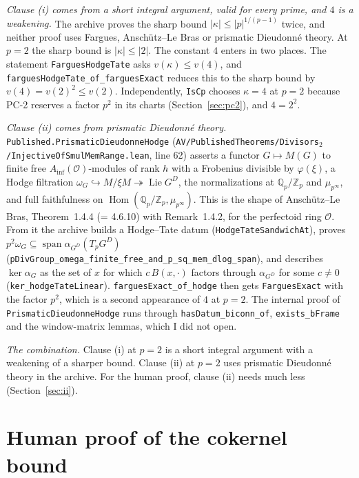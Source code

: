 \documentclass[11pt]{article}
\newcommand{\lean}[1]{\nolinkurl{#1}}
\theoremstyle{definition}
\theoremstyle{remark}
\newcommand{\cO}{\mathcal O}
\begin{document}
\emph{Clause (i) comes from a short integral argument, valid for every prime, and $4$ is a weakening.} The archive proves the sharp bound $\lvert\kappa\rvert\le\lvert p\rvert^{1/(p-1)}$ twice, and neither proof uses Fargues, Anschütz--Le Bras or prismatic Dieudonné theory. At $p=2$ the sharp bound is $\lvert\kappa\rvert\le\lvert2\rvert$. The constant $4$ enters in two places. The statement \lean{FarguesHodgeTate} asks $v(\kappa)\le v(4)$, and \lean{farguesHodgeTate_of_farguesExact} reduces this to the sharp bound by $v(4)=v(2)^2\le v(2)$. Independently, \lean{IsCp} chooses $\kappa=4$ at $p=2$ because PC-2 reserves a factor $p^2$ in its charts (Section~\ref{sec:pc2}), and $4=2^2$.

\emph{Clause (ii) comes from prismatic Dieudonné theory.} \lean{Published.PrismaticDieudonneHodge} (\texttt{AV/PublishedTheorems/Divisors$_2$/InjectiveOfSmulMemRange.lean}, line 62) asserts a functor $G\mapsto M(G)$ to finite free $A_{\inf}(\cO)$-modules of rank $h$ with a Frobenius divisible by $\varphi(\xi)$, a Hodge filtration $\omega_G\hookrightarrow M/\xi M\twoheadrightarrow\operatorname{Lie}G^D$, the normalizations at $\mathbb Q_p/\mathbb Z_p$ and $\mu_{p^\infty}$, and full faithfulness on $\operatorname{Hom}(\mathbb Q_p/\mathbb Z_p,\mu_{p^\infty})$. This is the shape of Anschütz--Le Bras, Theorem~1.4.4 (= 4.6.10) with Remark~1.4.2, for the perfectoid ring $\cO$. From it the archive builds a Hodge--Tate datum (\lean{HodgeTateSandwichAt}), proves $p^2\omega_G\subseteq\operatorname{span}\alpha_{G^D}(T_pG^D)$ (\lean{pDivGroup_omega_finite_free_and_p_sq_mem_dlog_span}), and describes $\ker\alpha_G$ as the set of $x$ for which $c\,B(x,\cdot)$ factors through $\alpha_{G^D}$ for some $c\ne0$ (\lean{ker_hodgeTateLinear}). \lean{farguesExact_of_hodge} then gets \lean{FarguesExact} with the factor $p^2$, which is a second appearance of $4$ at $p=2$. The internal proof of \lean{PrismaticDieudonneHodge} runs through \lean{hasDatum_biconn_of}, \lean{exists_bFrame} and the window-matrix lemmas, which I did not open.

\emph{The combination.} Clause (i) at $p=2$ is a short integral argument with a weakening of a sharper bound. Clause (ii) at $p=2$ uses prismatic Dieudonné theory in the archive. For the human proof, clause (ii) needs much less (Section~\ref{sec:ii}).

\section{Human proof of the cokernel bound}\label{sec:i}
\end{document}
